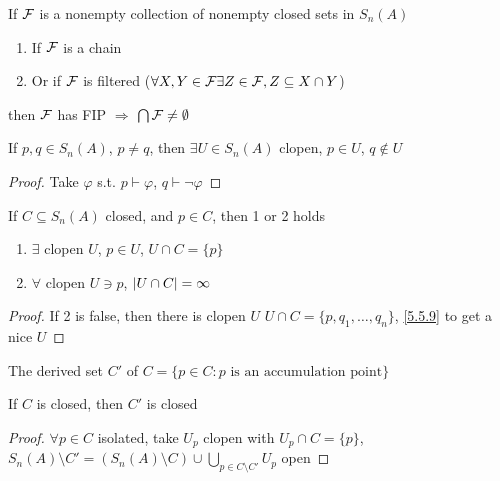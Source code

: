 \documentclass[11pt]{article}
\begin{document}
\begin{corollary}[]
If \(\mathcal{F}\) is a nonempty collection of nonempty closed sets in \(S_n(A)\)
\begin{enumerate}
\item If \(\mathcal{F}\) is a chain
\item Or if \(\mathcal{F}\) is filtered (\(\forall X,Y\in\mathcal{F}\exists Z\in\mathcal{F},Z\subseteq X\cap Y\))
\end{enumerate}


then \(\mathcal{F}\) has FIP \(\Rightarrow\) \(\bigcap\mathcal{F}\neq\emptyset\)
\end{corollary}

\begin{proposition}
\label{5.5.9}
If \(p,q\in S_n(A)\), \(p\neq q\), then \(\exists U\in S_n(A)\) clopen, \(p\in U\), \(q\notin U\)
\end{proposition}

\begin{proof}
Take \(\varphi\) s.t. \(p\vdash\varphi\), \(q\vdash\neg\varphi\)
\end{proof}

\begin{proposition}[]
If \(C\subseteq S_n(A)\) closed, and \(p\in C\), then 1 or 2 holds
\begin{enumerate}
\item \(\exists\) clopen \(U\), \(p\in U\), \(U\cap C=\{p\}\)
\item \(\forall\) clopen \(U\ni p\), \(\abs{U\cap C}=\infty\)
\end{enumerate}
\end{proposition}

\begin{proof}
If 2 is false, then there is clopen \(U\) \(U\cap C=\{p,q_1,\dots,q_n\}\), \ref{5.5.9} to get a nice \(U\)
\end{proof}

\begin{definition}[]
The derived set \(C'\) of \(C=\{p\in C:p\text{ is an accumulation point}\}\)
\end{definition}

\begin{proposition}[]
If \(C\) is closed, then \(C'\) is closed
\end{proposition}

\begin{proof}
\(\forall p\in C\) isolated, take \(U_p\) clopen
with \(U_p\cap C=\{p\}\), \(S_n(A)\setminus C'=(S_n(A)\setminus C)\cup\bigcup_{p\in C\setminus C'}U_p\) open
\end{proof}
\end{document}
